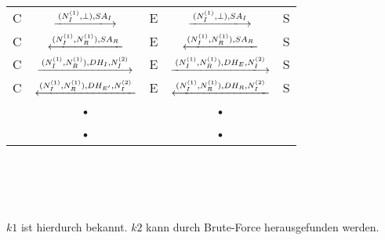 \documentclass[12pt,pdftex,a4paper]{article}
\begin{document}
\begin{tabular}{|c|c|c|c|c|}
		C &  $\xlongrightarrow{(N_{I}^{(1)}, \bot), SA_{I}}$  & E &  $\xlongrightarrow{(N_{I}^{(1)}, \bot), SA_{I}}$ & S \\ 
		
			C &  $\xlongleftarrow{(N_{I}^{(1)}, N_{R}^{(1)}), SA_{R}}$  & E &  $\xlongleftarrow{(N_{I}^{(1)}, N_{R}^{(1)}), SA_{R}}$ & S \\ 
				C &  $\xlongrightarrow{(N_{I}^{(1)}, N_{R}^{(1)}), DH_{I},N_{I}^{(2)}}$  & E &   $\xlongrightarrow{(N_{I}^{(1)}, N_{R}^{(1)}), DH_{E},N_{I}^{(2)}}$& S \\ 
				
		C &  $\xlongleftarrow{(N_{I}^{(1)}, N_{R}^{(1)}), DH_{E'},N_{I}^{(2)}}$  & E &  $\xlongleftarrow{(N_{I}^{(1)}, N_{R}^{(1)}), DH_{R},N_{I}^{(2)}}$ & S \\ 
		
		& • &  & • &  \\ 
		& • &  & • &  \\ 
		
	\end{tabular}
\\\\\\\\
$k1$ ist hierdurch bekannt. $k2$ kann durch Brute-Force herausgefunden werden. 
\end{document}
